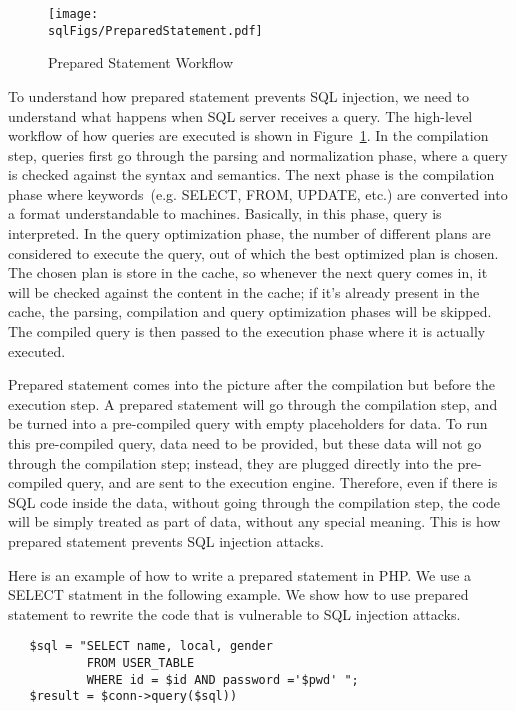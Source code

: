 \begin{figure}
\centering
\texttt{[image: \\sqlFigs/PreparedStatement.pdf]}
\caption{Prepared Statement Workflow}
\label{sql:fig:preparedstatement}
\end{figure}


To understand how prepared statement prevents SQL injection, 
we need to understand what happens when SQL server receives a query. 
The high-level workflow of how queries are executed is shown in Figure~\ref{sql:fig:preparedstatement}.
In the compilation step, queries first go through the parsing and normalization phase, 
where a query is checked against the syntax and semantics. 
The next phase is the compilation phase where keywords~(e.g. SELECT, FROM, UPDATE, etc.) 
are converted into a format understandable to machines. 
Basically, in this phase, query is interpreted.
In the query optimization phase, the number of different plans are considered to 
execute the query,  out of which the best optimized plan is chosen. 
The chosen plan is store in the cache, so 
whenever the next query comes in, 
it will be checked against the content in the cache; if it's already present in the cache,
the parsing, compilation and query optimization phases will be skipped. 
The compiled query is then passed to the execution phase 
where it is actually executed.


Prepared statement comes into the picture after the compilation but before the execution step. 
A prepared statement will go through the compilation step, and be turned into
a pre-compiled query with empty placeholders for data. To run this pre-compiled query,
data need to be provided, but these data will not go through the compilation step; instead,
they are plugged directly into the pre-compiled query, and are sent to the execution engine.
Therefore, even if there is SQL code inside the data, without going through the compilation
step, the code will be simply treated as part of data, without any special meaning.  
This is how prepared statement prevents SQL injection attacks.


Here is an example of how to write a prepared statement in PHP.  We use a SELECT statment in
the following example.  We show how to use prepared statement to rewrite the code that is
vulnerable to SQL injection attacks.


\begin{lstlisting}
   $sql = "SELECT name, local, gender  
           FROM USER_TABLE 
           WHERE id = $id AND password ='$pwd' ";
   $result = $conn->query($sql)) 
\end{lstlisting}

